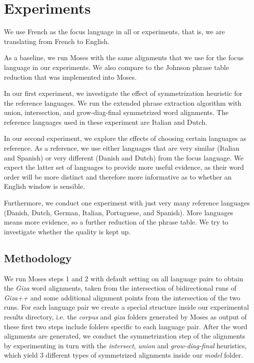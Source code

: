 \documentclass[11pt]{article}
\begin{document}
\section{Experiments}
We use French as the focus language in all or experiments, that is, we are translating from French to English. 

As a baseline, we run Moses with the same alignments that we use for the focus language in our experiments. We also compare to the Johnson phrase table reduction that was implemented into Moses.

In our first experiment, we investigate the effect of symmetrization heuristic for the reference languages. We run the extended phrase extraction algorithm with union, intersection, and grow-diag-final symmetrized word alignments. The reference languages used in these experiment are Italian and Dutch.

 In our second experiment, we explore the effects of choosing certain languages as reference. As a reference, we use either languages that are very similar (Italian and Spanish) or very different (Danish and Dutch) from the focus language. We expect the latter set of languages to provide more useful evidence, as their word order will be more distinct and therefore more informative as to whether an English window is sensible.

Furthermore, we conduct one experiment with just very many reference languages (Danish, Dutch, German, Italian, Portuguese, and Spanish). More languages means more evidence, so a further reduction of the phrase table. We try to investigate whether the quality is kept up. 


\subsection{Methodology}

We run Moses steps 1 and 2 with default setting on all language pairs to obtain the \textit{Giza} word alignments, taken from the intersection of bidirectional runs of \textit{Giza++} and some additional alignment points from the intersection of the two runs. For each language pair we create a special structure inside our experimental results directory, i.e. the \textit{corpus} and \textit{giza} folders generated by Moses as output of these first two steps include folders specific to each language pair. After the word alignments are generated, we conduct the symmetrization step of the alignments by experimenting in turn with the \textit{intersect}, \textit{union} and \textit{grow-diag-final} heuristics, which yield 3 different types of symmetrized alignments inside our \textit{model} folder. 
\end{document}
